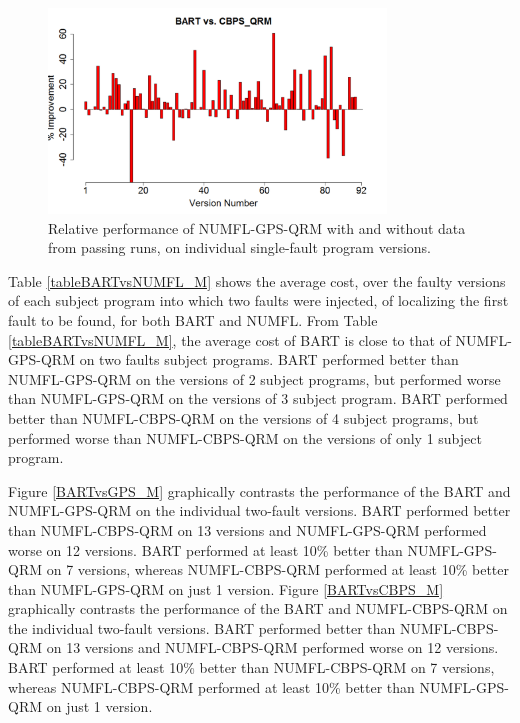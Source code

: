 \begin{figure}[!thpb]
\centering
\includegraphics[width=0.8\textwidth]{chapter4_BARTvsCBPS.pdf}
\caption{Relative performance of NUMFL-GPS-QRM with and without data from passing runs, on individual single-fault program versions.}
\label{BARTvsCBPS}
\end{figure}

Table \ref{tableBARTvsNUMFL_M} shows the average cost, over the faulty versions of each subject program into which two faults were injected, of localizing the first fault to be found, for both BART and NUMFL.  From Table \ref{tableBARTvsNUMFL_M}, the average cost of BART is close to that of NUMFL-GPS-QRM on two faults subject programs. BART performed better than NUMFL-GPS-QRM on the versions of  2 subject programs, but performed worse than NUMFL-GPS-QRM on the versions of 3 subject program.  BART performed better than NUMFL-CBPS-QRM on the versions of 4 subject programs, but performed worse than NUMFL-CBPS-QRM on the versions of only 1 subject program.

Figure \ref{BARTvsGPS_M} graphically contrasts the performance of the BART and NUMFL-GPS-QRM on the individual two-fault versions.  BART performed better than NUMFL-CBPS-QRM on 13 versions and NUMFL-GPS-QRM performed worse on 12 versions.  BART performed at least 10\% better than NUMFL-GPS-QRM on 7 versions, whereas NUMFL-CBPS-QRM performed at least 10\% better than NUMFL-GPS-QRM on just 1 version. Figure \ref{BARTvsCBPS_M} graphically contrasts the performance of the BART and NUMFL-CBPS-QRM on the individual two-fault versions.  BART performed better than NUMFL-CBPS-QRM on 13 versions and NUMFL-CBPS-QRM performed worse on 12 versions.  BART performed at least 10\% better than NUMFL-CBPS-QRM on 7 versions, whereas NUMFL-CBPS-QRM performed at least 10\% better than NUMFL-GPS-QRM on just 1 version.

